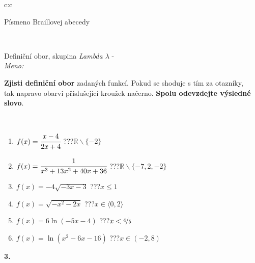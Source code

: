 \documentclass[10pt]{report}
\begin{document}
\begin{tabular}{c:c}
\begin{minipage}[c][104.5mm][t]{0.5\linewidth}
\begin{center}
\begin{minipage}{0.20\linewidth}
\begin{center}
{\small Písmeno Braillovej abecedy}
\end{center}
\end{minipage}
\end{center}
\end{minipage}
\\ \hdashline
\begin{minipage}[c][104.5mm][t]{0.5\linewidth}
\begin{center}
\vspace{7mm}
{\huge Definiční obor, skupina \textit{Lambda $\lambda$} -}\\[5mm]
\textit{Meno:}\phantom{xxxxxxxxxxxxxxxxxxxxxxxxxxxxxxxxxxxxxxxxxxxxxxxxxxxxxxxxxxxxxxxxx}\\[5mm]
\begin{minipage}{0.95\linewidth}
\textbf{Zjisti definiční obor} zadaných funkcí. Pokud se shoduje s tím za otazníky,\\tak napravo obarvi příslušející kroužek načerno. \textbf{Spolu odevzdejte výsledné slovo}.
\end{minipage}
\\[1mm]
\begin{minipage}{0.79\linewidth}
\begin{center}
\begin{varwidth}{\linewidth}
\begin{enumerate}
\normalsizerrr
\item $f(x)=\cfrac{x-4}{2x+4}$\quad \dotfill\; ???\;\dotfill \quad $\mathbb{R}\smallsetminus\{-2\}$
\item $f(x)=\cfrac{1}{x^3+13x^2+40x+36}$\quad \dotfill\; ???\;\dotfill \quad $\mathbb{R}\smallsetminus\{-7,2,-2\}$
\item $f(x)=-4\sqrt{-3x-3}$\quad \dotfill\; ???\;\dotfill \quad $x\leq1$
\item $f(x)=\sqrt{-x^2-2x}$\quad \dotfill\; ???\;\dotfill \quad $x\in\langle0 , 2\rangle$
\item $f(x)=6\ln{(-5x-4)}$\quad \dotfill\; ???\;\dotfill \quad $x<\nicefrac{4}{5}$
\item $f(x)=\ln{(x^2-6x-16)}$\quad \dotfill\; ???\;\dotfill \quad $x\in(-2 , 8)$
\end{enumerate}
\end{varwidth}
\end{center}
\end{minipage}
\begin{minipage}{0.20\linewidth}
\begin{center}
{\Huge\bfseries 3.} \\[2mm]

\end{center}
\end{minipage}
\end{center}
\end{minipage}
\end{tabular}
\end{document}

